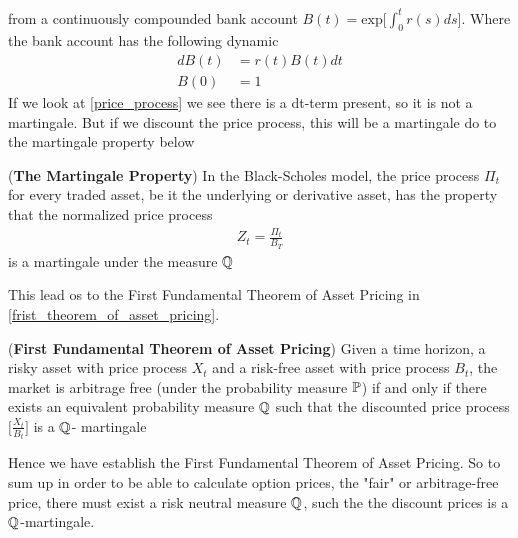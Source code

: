 from a continuously compounded bank account $B(t)= \text{exp} \Big[\int_{0}^{t}r(s)ds \Big]$.
Where the bank account has the following dynamic
\begin{align}
    dB(t) &= r(t)B(t) dt \label{bank1}\\
    B(0) & = 1 \label{bank2}
\end{align}
If we look at \autoref{price_process} we see there is a dt-term present, so it is not a martingale.
But if we discount the price process, this will be a martingale do to the martingale property below
\begin{proposition}
    (\textbf{The Martingale Property}) In the Black-Scholes model, the price process $\Pi_t$
    for every traded asset, be it the underlying or derivative asset, has the property that the normalized price process
    \begin{align*}
        Z_t = \frac{\Pi_t}{B_T}
    \end{align*}
    is a martingale under the measure $\mathbb{Q}$ \cite{Bjork}
\end{proposition}
\noindent 
This lead os to the First Fundamental Theorem of Asset Pricing in \autoref{frist_theorem_of_asset_pricing}.
\begin{theorem}
    (\textbf{First Fundamental Theorem of Asset Pricing})
    Given a time horizon, a risky asset with price process $X_t$ and a
    risk-free asset with price process $B_t$, the market is arbitrage free 
    (under the probability measure $\mathbb{P}$) if and only if there exists an 
    equivalent probability measure $\mathbb{Q}$ such that the discounted price process
    $\Big[\frac{X_t}{B_t}\Big]$  is a $\mathbb{Q}$- martingale \cite{Bjork}
    \label{frist_theorem_of_asset_pricing}
\end{theorem}
\noindent 
Hence we have establish the First Fundamental Theorem of Asset Pricing. So to sum up in order to be able to calculate
option prices, the "fair" or arbitrage-free price, there must exist a risk neutral measure $\mathbb{Q}$, such the the discount prices
is a $\mathbb{Q}$-martingale. 
